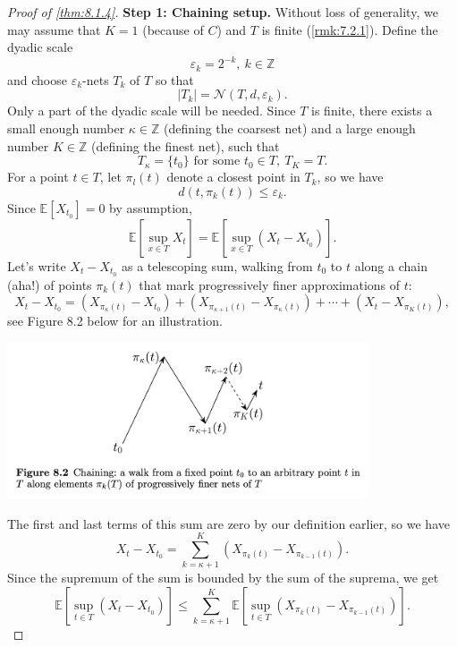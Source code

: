 \begin{proof}[Proof of \cref{thm:8.1.4}]
\textbf{Step 1: Chaining setup.} Without loss of generality, we may assume that $K = 1$ (because of $C$) and 
$T$ is finite (\cref{rmk:7.2.1}). Define the dyadic scale 
\[ \varepsilon_k = 2^{-k}, \ k \in \mathbb{Z} \]
and choose $\varepsilon_k$-nets $T_k$ of $T$ so that 
\[ |T_k| = \mathcal{N}(T, d, \varepsilon_k). \]
Only a part of the dyadic scale will be needed. Since $T$ is finite, there exists a small enough number 
$\kappa \in \mathbb{Z}$ (defining the coarsest net) and a large enough number $K \in \mathbb{Z}$ (defining the 
finest net), such that 
\[ T_{\kappa} = \{t_0\} \text{ for some } t_0 \in T, \ T_K = T. \]
For a point $t \in T$, let $\pi_l(t)$ denote a closest point in $T_k$, so we have 
\[ d(t, \pi_k(t)) \leq \varepsilon_k. \]
Since $\mathbb{E}\left[ X_{t_0} \right] = 0$ by assumption, 
\[ \mathbb{E}\left[ \sup_{x \in T}X_t \right] = \mathbb{E}\left[ \sup_{x \in T}(X_t - X_{t_0}) \right]. \]
Let's write $X_t - X_{t_0}$ as a telescoping sum, walking from $t_0$ to $t$ along a chain (aha!) of points 
$\pi_k(t)$ that mark progressively finer approximations of $t$:
\[ X_t - X_{t_0} = (X_{\pi_{\kappa}(t)} - X_{t_0}) + (X_{\pi_{\kappa + 1}(t)} - X_{\pi_{\kappa}(t)}) 
+ \cdots + (X_t - X_{\pi_{K}(t)}), \]
see Figure 8.2 below for an illustration.
\begin{center}
    \includegraphics[width=0.8\textwidth]{Chapter 8/fig8-2.png}
\end{center}
The first and last terms of this sum are zero by our definition earlier, so we have 
\[ X_t - X_{t_0} = \sum_{k = \kappa + 1}^{K} (X_{\pi_k(t)} - X_{\pi_{k - 1}(t)}). \]
Since the supremum of the sum is bounded by the sum of the suprema, we get 
\[ \mathbb{E}\left[ \sup_{t \in T}(X_t - X_{t_0}) \right] \leq 
\sum_{k = \kappa + 1}^{K} \mathbb{E}\left[ \sup_{t \in T}(X_{\pi_k(t)} - X_{\pi_{k - 1}(t)}) \right]. \]


\end{proof}
